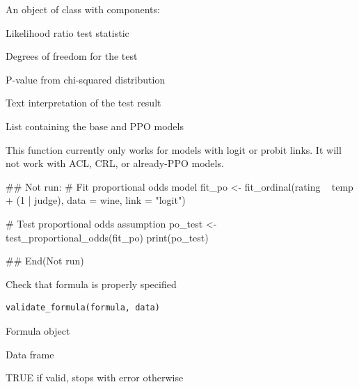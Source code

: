 \documentclass[a4paper]{book}
\begin{document}
%
\begin{Value}
An object of class  with components:
\begin{ldescription}
\item[\code{statistic}] Likelihood ratio test statistic
\item[\code{df}] Degrees of freedom for the test
\item[\code{p\_value}] P-value from chi-squared distribution
\item[\code{conclusion}] Text interpretation of the test result
\item[\code{models}] List containing the base and PPO models
\end{ldescription}
\end{Value}
%
\begin{Note}
This function currently only works for models with logit or probit links.
It will not work with ACL, CRL, or already-PPO models.
\end{Note}
%
\begin{Examples}
\begin{ExampleCode}
## Not run: 
# Fit proportional odds model
fit_po <- fit_ordinal(rating ~ temp + (1 | judge),
                      data = wine, link = "logit")

# Test proportional odds assumption
po_test <- test_proportional_odds(fit_po)
print(po_test)

## End(Not run)

\end{ExampleCode}
\end{Examples}
%
\begin{Description}
Check that formula is properly specified
\end{Description}
%
\begin{Usage}
\begin{verbatim}
validate_formula(formula, data)
\end{verbatim}
\end{Usage}
%
\begin{Arguments}
\begin{ldescription}
\item[\code{formula}] Formula object

\item[\code{data}] Data frame
\end{ldescription}
\end{Arguments}
%
\begin{Value}
TRUE if valid, stops with error otherwise
\end{Value}
\end{document}
